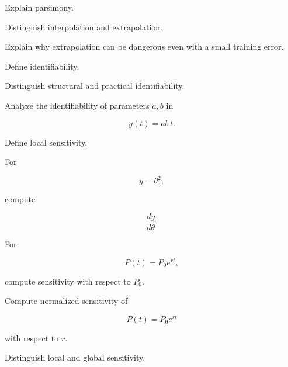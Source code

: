 \begin{exercise}[3]
Explain parsimony.
\end{exercise}

\begin{exercise}[2]
Distinguish interpolation and extrapolation.
\end{exercise}

\begin{exercise}[3]
Explain why extrapolation can be dangerous even with a small training error.
\end{exercise}

\begin{exercise}[2]
Define identifiability.
\end{exercise}

\begin{exercise}[3]
Distinguish structural and practical identifiability.
\end{exercise}

\begin{exercise}[3]
Analyze the identifiability of parameters \(a,b\) in

\[
y(t)=ab\,t.
\]
\end{exercise}

\begin{exercise}[2]
Define local sensitivity.
\end{exercise}

\begin{exercise}[3]
For

\[
y=\theta^2,
\]

compute

\[
\frac{dy}{d\theta}.
\]
\end{exercise}

\begin{exercise}[3]
For

\[
P(t)=P_0e^{rt},
\]

compute sensitivity with respect to \(P_0\).
\end{exercise}

\begin{exercise}[3]
Compute normalized sensitivity of

\[
P(t)=P_0e^{rt}
\]

with respect to \(r\).
\end{exercise}

\begin{exercise}[3]
Distinguish local and global sensitivity.
\end{exercise}


